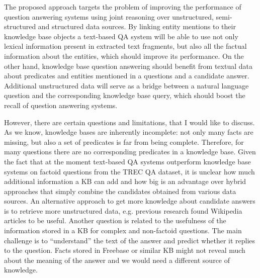 %


The proposed approach targets the problem of improving the performance of question answering systems using joint reasoning over unstructured, semi-structured and structured data sources.
By linking entity mentions to their knowledge base objects a text-based QA system will be able to use not only lexical information present in extracted text fragments, but also all the factual information about the entities, which should improve its performance.
On the other hand, knowledge base question answering should benefit from textual data about predicates and entities mentioned in a questions and a candidate answer.
Additional unstructured data will serve as a bridge between a natural language question and the corresponding knowledge base query, which should boost the recall of question answering systems.

However, there are certain questions and limitations, that I would like to discuss.
As we know, knowledge bases are inherently incomplete: not only many facts are missing, but also a set of predicates is far from being complete.
Therefore, for many questions there are no corresponding predicates in a knowledge base.
Given the fact that at the moment text-based QA systems outperform knowledge base systems on factoid questions from the TREC QA dataset, it is unclear how much additional information a KB can add and how big is an advantage over hybrid approaches that simply combine the candidates obtained from various data sources.
An alternative approach to get more knowledge about candidate answers is to retrieve more unstructured data, e.g. previous research found Wikipedia articles to be useful.
Another question is related to the usefulness of the information stored in a KB for complex and non-factoid questions.
The main challenge is to ``understand'' the text of the answer and  predict whether it replies to the question.
Facts stored in Freebase or similar KB might not reveal much about the meaning of the answer and we would need a different source of knowledge.


